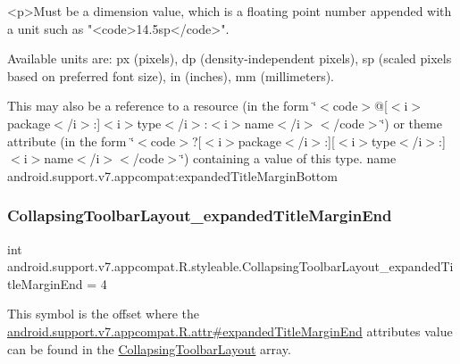 \begin{DoxyVerb}      <p>Must be a dimension value, which is a floating point number appended with a unit such as "<code>14.5sp</code>".
\end{DoxyVerb}
 Available units are\+: px (pixels), dp (density-\/independent pixels), sp (scaled pixels based on preferred font size), in (inches), mm (millimeters). 

This may also be a reference to a resource (in the form \char`\"{}$<$code$>$@\mbox{[}$<$i$>$package$<$/i$>$\+:\mbox{]}$<$i$>$type$<$/i$>$\+:$<$i$>$name$<$/i$>$$<$/code$>$\char`\"{}) or theme attribute (in the form \char`\"{}$<$code$>$?\mbox{[}$<$i$>$package$<$/i$>$\+:\mbox{]}\mbox{[}$<$i$>$type$<$/i$>$\+:\mbox{]}$<$i$>$name$<$/i$>$$<$/code$>$\char`\"{}) containing a value of this type.  name android.\+support.\+v7.\+appcompat\+:expanded\+Title\+Margin\+Bottom \mbox{\label{classandroid_1_1support_1_1v7_1_1appcompat_1_1R_1_1styleable_ad4ab1dac8092468e823d2ec10e403b6c}} 
\subsubsection{\texorpdfstring{Collapsing\+Toolbar\+Layout\+\_\+expanded\+Title\+Margin\+End}{CollapsingToolbarLayout\_expandedTitleMarginEnd}}
{\footnotesize\ttfamily int android.\+support.\+v7.\+appcompat.\+R.\+styleable.\+Collapsing\+Toolbar\+Layout\+\_\+expanded\+Title\+Margin\+End = 4\hspace{0.3cm}{\ttfamily [static]}}

This symbol is the offset where the \hyperlink{classandroid_1_1support_1_1v7_1_1appcompat_1_1R_1_1attr_a50689e9cb989e5597e509e70eb5f04e4}{android.\+support.\+v7.\+appcompat.\+R.\+attr\#expanded\+Title\+Margin\+End} attribute\textquotesingle{}s value can be found in the \hyperlink{classandroid_1_1support_1_1v7_1_1appcompat_1_1R_1_1styleable_a8d282d917f35e5a08dd37db243410383}{Collapsing\+Toolbar\+Layout} array.

